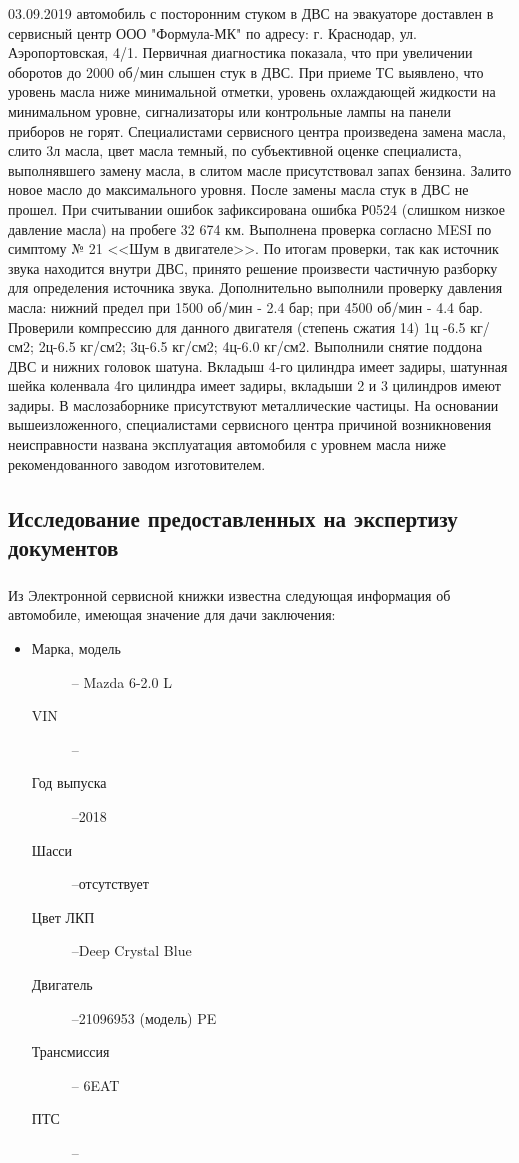 \par 03.09.2019 автомобиль с посторонним стуком в ДВС на эвакуаторе доставлен  в сервисный центр ООО "Формула-МК" по адресу: г. Краснодар, ул. Аэропортовская, 4/1.  Первичная диагностика показала, что при увеличении оборотов до 2000 об/мин слышен стук в ДВС. При приеме ТС выявлено, что уровень масла ниже минимальной отметки, уровень охлаждающей жидкости на минимальном уровне, сигнализаторы или контрольные лампы на панели приборов не горят. Специалистами сервисного центра произведена замена масла, слито 3л масла, цвет масла темный, по субъективной оценке специалиста, выполнявшего замену масла, в слитом масле присутствовал запах бензина. Залито новое масло  до максимального уровня. После замены масла стук в ДВС не прошел. При считывании ошибок зафиксирована ошибка Р0524 (слишком низкое давление масла) на пробеге 32 674 км. Выполнена проверка согласно MESI по симптому № 21 <<Шум в двигателе>>. По итогам проверки, так как источник звука находится внутри ДВС, принято решение произвести частичную разборку для определения источника звука. Дополнительно выполнили проверку давления масла: нижний предел при 1500 об/мин - 2.4 бар; при 4500 об/мин - 4.4 бар. %
Проверили компрессию для данного двигателя (степень сжатия 14) 1ц -6.5 кг/см2; 2ц-6.5 кг/см2; 3ц-6.5 кг/см2; 4ц-6.0 кг/см2. Выполнили снятие поддона ДВС и нижних головок шатуна. Вкладыш 4-го цилиндра имеет задиры, шатунная шейка коленвала 4го цилиндра имеет задиры, вкладыши 2 и 3 цилиндров имеют задиры. В маслозаборнике присутствуют металлические частицы.  На основании вышеизложенного, специалистами сервисного центра причиной возникновения неисправности названа эксплуатация автомобиля  с уровнем масла ниже рекомендованного заводом изготовителем.

\subsection{Исследование предоставленных на экспертизу документов}

 \subparagraph*{}Из Электронной сервисной книжки  известна следующая информация об автомобиле, имеющая значение для дачи заключения:
	\begin{itemize}
		\item[ ] 
			\begin{description}
			\item[Марка, модель] -- Mazda 6-2.0 L
			\item[VIN] -- \vin
			\item[Год выпуска] --2018
			\item[Шасси] --отсутствует
			\item[Цвет ЛКП] --Deep Crystal Blue
			\item[Двигатель] --21096953 (модель) PE
			\item[Трансмиссия] -- 6EAT
			\item[ПТС] --
%						
		\end{description}
		\end{itemize}
	
